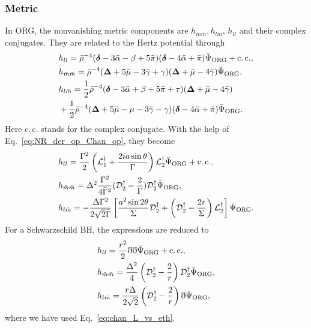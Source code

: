 \documentclass[aps,prd,amsmath,floats,floatfix, twocolumn,
superscriptaddress,nofootinbib,showpacs]{revtex4-1}
\newcommand{\hertzbar}{\bar{\Psi}_{\rm ORG}}
\begin{document}
\subsubsection{Metric}
\label{subsubsec:reconstruction_metric}
In ORG, the nonvanishing metric components are $h_{\bar{m}\bar{m}}, h_{l\bar{m}}$, $h_{ll}$ and their complex conjugates. They are related to the Hertz potential through \cite{1975PhRvD..11.2042C}
\begin{subequations}
\label{eq:CCK_metric_original_expression}
\begin{align}
    &h_{ll}=\bar{\rho}^{-4}(\bm{\delta}-3\bar{\alpha}-\beta+5\bar{\pi})(\bm{\delta}-4\bar{\alpha}+\bar{\pi})\bar{\Psi}_{\rm ORG}+\rm{c}.\, c., \\
    &h_{\bar{m}\bar{m}}=\bar{\rho}^{-4}(\bm{\Delta}+5\bar{\mu}-3\bar{\gamma}+\gamma)(\bm{\Delta}+\bar{\mu}-4\bar{\gamma})\bar{\Psi}_{\rm ORG}, \\
    &h_{l\bar{m}}=\frac{1}{2}\bar{\rho}^{-4}(\bm{\delta}-3\bar{\alpha}+\beta+5\bar{\pi}+\tau)(\bm{\Delta}+\bar{\mu}-4\bar{\gamma}) \notag \\
    &+\frac{1}{2}\bar{\rho}^{-4}(\bm{\Delta}+5\bar{\mu}-\mu-3\bar{\gamma}-\gamma)(\bm{\delta}-4\bar{\alpha}+\bar{\pi})\bar{\Psi}_{\rm ORG}.
\end{align}
\end{subequations}
Here c.\,c. stands for the complex conjugate. With the help of Eq.~\eqref{eq:NR_der_op_Chan_op}, they become
\begin{subequations}
\label{eq:reconstruction_all_h}
\begin{align}
    &h_{ll}=\frac{\Gamma^2}{2}\left(\mathcal{L}_1^\dagger+\frac{2ia\sin\theta}{\Gamma}\right)\mathcal{L}_2^\dagger  \hertzbar+\rm{c}.\, c., \\
    &h_{\bar{m}\bar{m}}=\Delta^2\frac{\Gamma^2}{4\bar{\Gamma}^2}(\mathcal{D}_2^\dagger-\frac{2}{\Gamma})\mathcal{D}_2^\dagger\hertzbar, \label{eq:reconstruction_hmbarmbar} \\
    &h_{l\bar{m}}
    =-\frac{\Delta\Gamma^2}{2\sqrt{2}\bar{\Gamma}}\left[\frac{a^2\sin2\theta}{\Sigma}\mathcal{D}_2^\dagger+\left(\mathcal{D}_2^\dagger-\frac{2r}{\Sigma}\right)\mathcal{L}_2^\dagger\right]\bar{\Psi}_{\rm ORG}. \label{eq:reconstruction_hlmbar}
\end{align}
\end{subequations}
For a Schwarzschild BH, the expressions are reduced to
\begin{equation}
\begin{aligned}
    &h_{ll}=\frac{r^2}{2}\eth\eth \hertzbar+\rm{c}.\, c., \\
    &h_{\bar{m}\bar{m}}=\frac{\Delta^2}{4}\left(\mathcal{D}_2^\dagger-\frac{2}{r}\right)\mathcal{D}_2^\dagger\hertzbar, \\
    &h_{l\bar{m}}
    =\frac{r\Delta}{2\sqrt{2}}\left(\mathcal{D}_2^\dagger-\frac{2}{r}\right)\eth\bar{\Psi}_{\rm ORG},
\end{aligned}
\end{equation}
where we have used Eq.~\eqref{eq:chan_L_vs_eth}.
\end{document}
